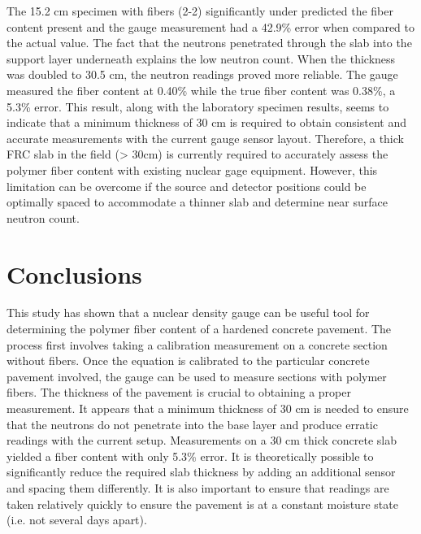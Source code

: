 \documentclass[9pt,twocolumn,twoside]{iscp}
\begin{document}
The 15.2 cm specimen with fibers (2-2) significantly under predicted the fiber content present and the gauge measurement had a 42.9\% error when compared to the actual value. The fact that the neutrons penetrated through the slab into the support layer underneath explains the low neutron count. When the thickness was doubled to 30.5 cm, the neutron readings proved more reliable. The gauge measured the fiber content at 0.40\% while the true fiber content was 0.38\%, a 5.3\% error. This result, along with the laboratory specimen results, seems to indicate that a minimum thickness of 30 cm is required to obtain consistent and accurate measurements with the current gauge sensor layout. Therefore, a thick FRC slab in the field (> 30cm) is currently required to accurately assess the polymer fiber content with existing nuclear gage equipment. However, this limitation can be overcome if the source and detector positions could be optimally spaced to accommodate a thinner slab and determine near surface neutron count.

\section{Conclusions}
This study has shown that a nuclear density gauge can be useful tool for determining the polymer fiber content of a hardened concrete pavement. The process first involves taking a calibration measurement on a concrete section without fibers. Once the equation is calibrated to the particular concrete pavement involved, the gauge can be used to measure sections with polymer fibers. The thickness of the pavement is crucial to obtaining a proper measurement. It appears that a minimum thickness of 30 cm is needed to ensure that the neutrons do not penetrate into the base layer and produce erratic readings with the current setup. Measurements on a 30 cm thick concrete slab yielded a fiber content with only 5.3\% error. It is theoretically possible to significantly reduce the required slab thickness by adding an additional sensor and spacing them differently. It is also important to ensure that readings are taken relatively quickly to ensure the pavement is at a constant moisture state (i.e. not several days apart).


\showacknow %


\end{document}
